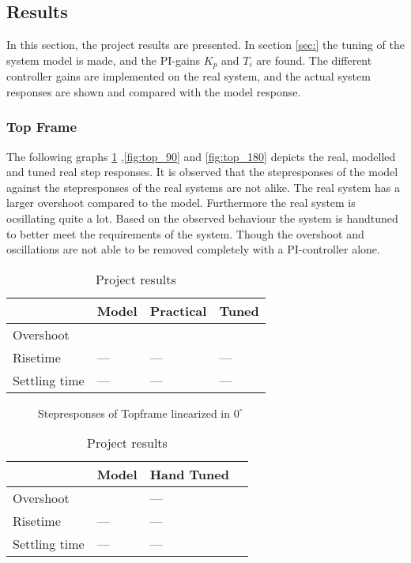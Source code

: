 \documentclass[../../Main]{subfiles}
\begin{document}
\subsection{Results}
\label{sec:results}

In this section, the project results are presented. In section \ref{sec:}  the tuning of the system model is made, and the PI-gains $K_p$ and $T_i$ are found. The different controller gains are implemented on the real system, and the actual system responses are shown and compared with the model response. 

\subsubsection{Top Frame}
\label{sec:top_frame_results}
The following graphs \ref{fig:top_0}
,\ref{fig:top_90} and \ref{fig:top_180} depicts the real, modelled and tuned real step responses.
It is observed that the stepresponses of the model against the stepresponses of the real systems are not alike. The real system has a larger overshoot compared to the model. Furthermore the real system is ocsillating quite a lot. Based on the observed behaviour the system is handtuned to better meet the requirements of the system. Though the overshoot and oscillations are not able to be removed completely with a PI-controller alone.

\begin{table}[H]
\centering
\begin{tabular}{|l|l|l|l|}
\hline
    	             & Model & Practical & Tuned \\
\hline
Overshoot               &    &   &  \\
\hline
Risetime                & ---   & ---  & --- \\
\hline
Settling time           & ---   & ---  & --- \\
\hline
\end{tabular}
\caption{Project results}
    \label{tab:project_results}
\end{table} 


\begin{figure}[H]
  \def\svgwidth{\textwidth}
  
  \caption{Stepresponses of Topframe linearized in $0^{\circ}$}
  \label{fig:top_0}
\end{figure}


\begin{table}[H]
\centering
\begin{tabular}{|l|l|l|l|}
\hline
                & Model  & Hand Tuned  \\
\hline
Overshoot               &    & --- \\
\hline
Risetime                & ---   & --- \\
\hline
Settling time           & ---   & --- \\
\hline
\end{tabular}
\caption{Project results}
    \label{tab:project_results}
\end{table} 
\end{document}
